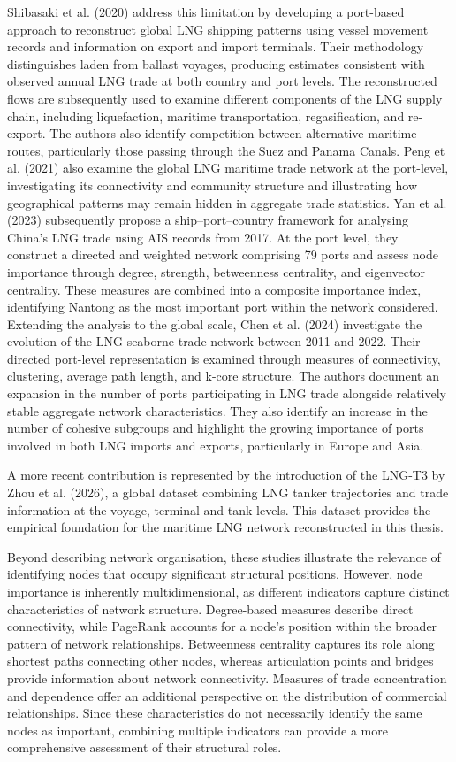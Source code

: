 \documentclass[pdftex,12pt,openright,a4paper,oneside]{book}
\begin{document}
Shibasaki et al. (2020) address this limitation by developing a port-based approach to reconstruct global LNG shipping patterns using vessel movement records and information on export and import terminals. Their methodology distinguishes laden from ballast voyages, producing estimates consistent with observed annual LNG trade at both country and port levels. The reconstructed flows are subsequently used to examine different components of the LNG supply chain, including liquefaction, maritime transportation, regasification, and re-export. The authors also identify competition between alternative maritime routes, particularly those passing through the Suez and Panama Canals. 
Peng et al. (2021) also examine the global LNG maritime trade network at the port-level, investigating its connectivity and community structure and illustrating how geographical patterns may remain hidden in aggregate trade statistics. Yan et al. (2023) subsequently propose a ship–port–country framework for analysing China's LNG trade using AIS records from 2017. At the port level, they construct a directed and weighted network comprising 79 ports and assess node importance through degree, strength, betweenness centrality, and eigenvector centrality. These measures are combined into a composite importance index, identifying Nantong as the most important port within the network considered.
Extending the analysis to the global scale, Chen et al. (2024) investigate the evolution of the LNG seaborne trade network between 2011 and 2022. Their directed port-level representation is examined through measures of connectivity, clustering, average path length, and k-core structure. The authors document an expansion in the number of ports participating in LNG trade alongside relatively stable aggregate network characteristics. They also identify an increase in the number of cohesive subgroups and highlight the growing importance of ports involved in both LNG imports and exports, particularly in Europe and Asia.

A more recent contribution is represented by the introduction of the LNG-T3 by Zhou et al. (2026), a global dataset combining LNG tanker trajectories and trade information at the voyage, terminal and tank levels. This dataset provides the empirical foundation for the maritime LNG network reconstructed in this thesis.

Beyond describing network organisation, these studies illustrate the relevance of identifying nodes that occupy significant structural positions. However, node importance is inherently multidimensional, as different indicators capture distinct characteristics of network structure. Degree-based measures describe direct connectivity, while PageRank accounts for a node's position within the broader pattern of network relationships. Betweenness centrality captures its role along shortest paths connecting other nodes, whereas articulation points and bridges provide information about network connectivity. Measures of trade concentration and dependence offer an additional perspective on the distribution of commercial relationships. Since these characteristics do not necessarily identify the same nodes as important, combining multiple indicators can provide a more comprehensive assessment of their structural roles.
\end{document}
